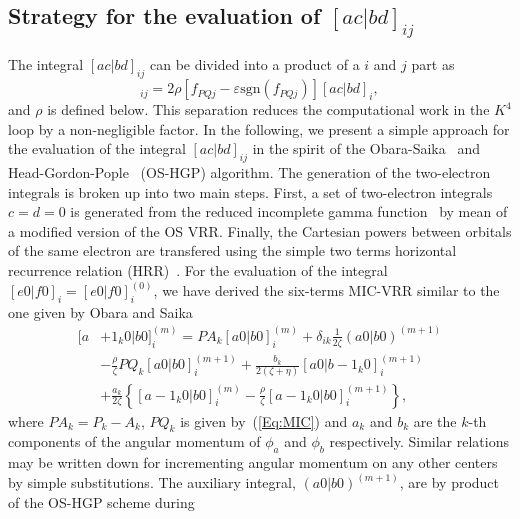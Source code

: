 \documentclass[prl,twocolumn,showpacs,twocolumngrid,superbib]{revtex4}
\begin{document}
\subsection{Strategy for the evaluation of $[ac|bd]_{ij}$}
The integral $[ac|bd]_{ij}$ can be divided into a product of a $i$ and $j$ part as
\begin{equation*}
 [ac|bd]_{ij}=2\rho[f_{PQj}-\varepsilon\mathrm{sgn}(f_{PQj}) ][ac|bd]_{i},
\end{equation*}
and $\rho$ is defined below. This separation reduces the computational work
in the $K^4$ loop by a non-negligible factor.
In the following, we present a simple approach for the evaluation of
the integral $[ac|bd]_{ij}$ in the spirit of the Obara-Saika~\cite{SObara86}
and Head-Gordon-Pople~\cite{MGordon88} (OS-HGP) algorithm.
The generation of the two-electron integrals is broken up into two
main steps. First, a set of two-electron integrals $c=d=0$ is generated from the
reduced incomplete gamma function~\cite{IShavitt63} 
by mean of a modified version of the OS VRR. Finally,
the Cartesian powers between orbitals of the same electron are transfered using 
the simple two terms horizontal recurrence relation (HRR)~\cite{MGordon88}.
For the evaluation of the integral $[e0|f0]_{i}=[e0|f0]_{i}^{(0)}$, we have 
derived the six-terms MIC-VRR similar
to the one given by Obara and Saika
\begin{equation}\label{Eq:MIC-VRR}
  \begin{split}
    [a&+1_k0|b0]_{i}^{(m)}=
    PA_k[a0|b0]_{i}^{(m)}
    +\delta_{ik}\frac{1}{2\zeta}(a0|b0)^{(m+1)}\\
    &-\frac{\rho}{\zeta}PQ_k[a0|b0]_{i}^{(m+1)}
    +\frac{b_k}{2(\zeta+\eta)}[a0|b-1_k0]_{i}^{(m+1)}\\
    &+\frac{a_k}{2\zeta}
       \left\{
	 [a-1_k0|b0]_{i}^{(m)}-\frac{\rho}{\zeta}[a-1_k0|b0]_{i}^{(m+1)}
       \right\},
  \end{split}
\end{equation}
where $PA_k=P_k-A_k$, $PQ_k$ is given by~(\ref{Eq:MIC})
and $a_k$ and $b_k$ are the $k$-th components of the angular 
momentum of $\phi_a$ and $\phi_b$ respectively. 
Similar relations may be written down for incrementing angular momentum 
on any other centers by simple substitutions.
The auxiliary integral, $(a0|b0)^{(m+1)}$, are by product of the OS-HGP scheme during
\end{document}

